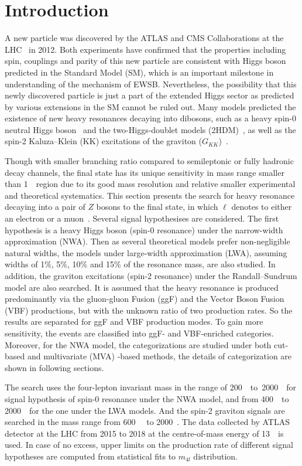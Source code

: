 \section{Introduction}

A new particle was discovered by the ATLAS and CMS Collaborations at the LHC~\cite{20121, 201230} in 2012.
Both experiments have confirmed that the properties including spin, couplings and parity of this new particle are consistent with 
Higgs boson predicted in the Standard Model (SM), which is an important milestone in understanding of the mechanism of EWSB.
Nevertheless, the possibility that this newly discovered particle is just a part of the extended Higgs sector
as predicted by various extensions in the SM cannot be ruled out.
Many models predicted the existence of new heavy resonances decaying into dibosons, 
such as a heavy spin-0 neutral Higgs boson~\cite{PhysRevD.36.3463}
and the two-Higgs-doublet models (2HDM)~\cite{BRANCO20121}, 
as well as the spin-2 Kaluza–Klein (KK) excitations of the graviton ($G_{KK}$)~\cite{DAVOUDIASL200043}.

Though with smaller branching ratio compared to semileptonic or fully hadronic decay channels, the \llll final state has its unique sensitivity in mass range smaller than 1~\tev~region 
due to its good mass resolution and relative smaller experimental and theoretical systematics.
This section presents the search for heavy resonance decaying into a pair of $Z$ bosons to the \llll final state, in which $\ell$ denotes to either an electron or a muon~\cite{Aad:2020fpj}. 
Several signal hypothesises are considered.
The first hypothesis is a heavy Higgs boson (spin-0 resonance) under the narrow-width approximation (NWA).
Then as several theoretical models prefer non-negligible natural widths, the models under large-width approximation (LWA), 
assuming widths of 1\%, 5\%, 10\% and 15\% of the resonance mass, are also studied.
In addition, the graviton excitations (spin-2 resonance) under the Randall–Sundrum model are also searched.
It is assumed that the heavy resonance is produced predominantly via the gluon-gluon Fusion (ggF) and the Vector Boson Fusion (VBF) productions, 
but with the unknown ratio of two production rates.
So the results are separated for ggF and VBF production modes.
To gain more sensitivity, the \llll events are classified into  ggF- and VBF-enriched categories.
Moreover, for the NWA model, the categorizations are studied under both cut-based and multivariate (MVA) -based methods, the details of categorization are shown in following sections.

The search uses the four-lepton invariant mass in the range of 200~\gev~to~2000~\gev~for signal hypothesis of spin-0 resonance under the NWA model,
and from 400~\gev~to 2000~\gev~for the one under the LWA models.
And the spin-2 graviton signals are searched in the mass range from 600~\gev~ to 2000~\gev.
The data collected by ATLAS detector at the LHC from 2015 to 2018 at the centre-of-mass energy of 13~\tev~is used.
In case of no excess, upper limits on the production rate of different signal hypotheses are computed from statistical fits to $m_{4l}$ distribution.

